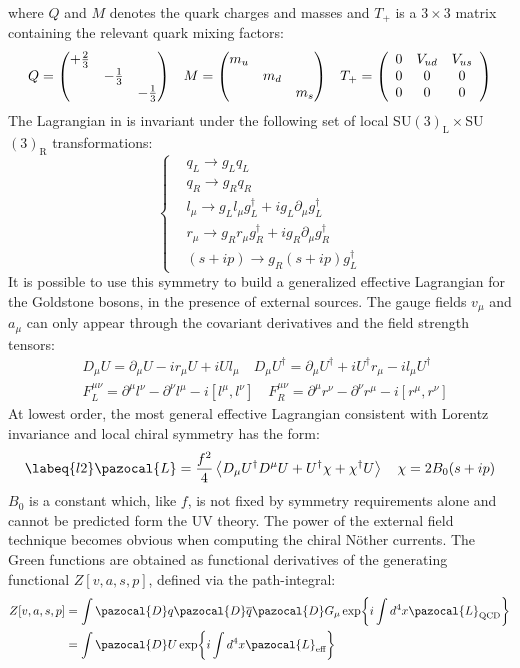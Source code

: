 \documentclass[../main.tex]{subfiles}
\begin{document}
where $Q$ and $M$ denotes the quark charges and masses and $T_+$ is a $3\times3$ matrix containing the relevant quark mixing factors:
\[
Q=\mqty(\dmat{+\frac{2}{3},-\frac{1}{3},-\frac{1}{3}}) \quad M=\mqty(\dmat{m_u,m_d,m_s}) \quad 
T_+=\left(\begin{array}{ccc}
    0 & V_{ud} & V_{us} \\
    0 & 0 & 0 \\
    0 & 0 & 0
\end{array}\right)
\]
The Lagrangian in  is invariant under the following set of local SU$(3)_{\text{L}}\times$SU$(3)_{\text{R}}$ transformations:
\[
\left\{
\begin{aligned}
&q_L\to g_Lq_L\\
&q_R\to g_Rq_R\\
&l_\mu\to g_Ll_\mu g_L^\dagger+ig_L\partial_\mu g_L^\dagger\\
&r_\mu\to g_Rr_\mu g_R^\dagger+ig_R\partial_\mu g_R^\dagger\\
&(s+ip)\to g_R(s+ip)g_L^\dagger
\end{aligned}
\right.
\]
It is possible to use this symmetry to build a generalized effective Lagrangian for the
Goldstone bosons, in the presence of external sources. The gauge fields $v_\mu$ and $a_\mu$ can only appear through the covariant derivatives and the field strength tensors:
\[
\begin{aligned}
&D_\mu U=\partial_\mu U-ir_\mu U+iUl_\mu \quad D_\mu U^\dagger=\partial_\mu U^\dagger+iU^\dagger r_\mu-il_\mu U^\dagger\\
&F^{\mu\nu}_L=\partial^\mu l^\nu-\partial^\nu l^\mu-i[l^\mu,l^\nu] \quad F^{\mu\nu}_R=\partial^\mu r^\nu-\partial^\nu r^\mu-i[r^\mu,r^\nu]
\end{aligned}
\]
At lowest order, the most general effective Lagrangian consistent with Lorentz invariance and local chiral symmetry has the form: 
\begin{equation}
\labeq{l2}    
\pazocal{L}=\frac{f^2}{4}\Braket{D_\mu U^\dagger D^\mu U+U^\dagger\chi+\chi^\dagger U} \quad \chi=2B_0(s+ip)
\end{equation}
$B_0$ is a constant which, like $f$, is not fixed by symmetry requirements alone and cannot be predicted form the UV theory. The power of the external field technique becomes obvious when computing the chiral N\"other currents. The Green functions are obtained as
functional derivatives of the generating functional $Z[v,a,s,p]$, defined via
the path-integral:
\begin{align*}
Z[v,a,s,p]&=\int\pazocal{D}q\pazocal{D}\overline{q}\pazocal{D}G_\mu\exp{i\int d^4x\pazocal{L}_{\text{QCD}}}\\
&=\int\pazocal{D}U\exp{i\int d^4x\pazocal{L}_{\text{eff}}}
\end{align*}
\end{document}
